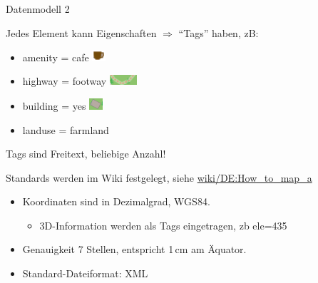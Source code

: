 \documentclass{beamer}
\begin{document}
\begin{frame}{Datenmodell 2}

Jedes Element kann Eigenschaften $\Rightarrow$ ``Tags'' haben, zB:
\begin{itemize}
  \item amenity = cafe \includegraphics[width=0.5cm]{cafe.png}
  \item highway = footway \includegraphics[width=1cm]{footway.png}
  \item building = yes  \includegraphics[width=0.5cm]{building.png}
  \item landuse = farmland
\end{itemize}

Tags sind Freitext, beliebige Anzahl!

Standards werden im Wiki festgelegt, siehe \href{http://wiki.openstreetmap.org/wiki/DE:How\_to\_map\_a}{wiki/DE:How\_to\_map\_a}

\vspace{4mm}
\pause
\begin{itemize}
  \item Koordinaten sind in Dezimalgrad, WGS84. 
	\begin{itemize}
  \item 3D-Information werden als Tags eingetragen, zb ele=435
\end{itemize}
  \item Genauigkeit 7 Stellen, entspricht 1\,cm am Äquator.
  \item Standard-Dateiformat: XML
\end{itemize}

\end{frame}
\end{document}

